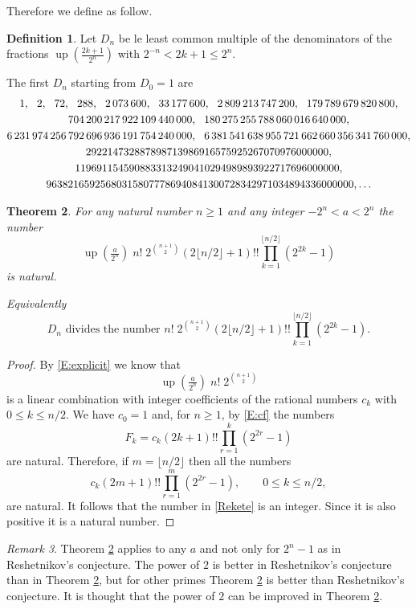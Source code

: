 \documentclass[10pt]{amsart}
\newtheorem{thm}{Theorem}
\theoremstyle{definition}
\newtheorem{defn}[thm]{Definition}
\theoremstyle{remark}
\newtheorem{rem}[thm]{Remark}
\DeclareMathOperator\up{up}
\def\nn{\mskip12mu}
\begin{document}
Therefore we define as follow.
\begin{defn} Let $D_n$ be le least common multiple of the denominators of the 
fractions $\up(\frac{2k+1}{2^n})$ with $2^{-n}<2k+1\le2^n$. 
\end{defn}

The first $D_n$ starting from $D_0=1$ are 
\begin{gather*}
1,\nn 2,\nn 72,\nn 288,\nn 2\,073\,600,\nn 33\,177\,600,\nn 2\,809\,213\,747\,200,\nn 179\,789\,679\,820\,800,\\
704\,200\,217\,922\,109\,440\,000,\nn 180\,275\,255\,788\,060\,016\,640\,000,\\
6\,231\,974\,256\,792\,696\,936\,191\,754\,240\,000,\nn 6\,381\,541\,638\,955\,721\,662\,660\,356\,341\,760\,000,\\
292214732887898713986916575925267070976000000,\\
1196911545908833132490410294989893922717696000000,\\
963821659256803158077786940841300728342971034894336000000,\dots
\end{gather*}




\begin{thm}\label{T:9}
For any natural number $n\ge1$ and any integer $-2^n< a< 2^n$ the number
\begin{equation}\label{Rekete}
\up(\tfrac{a}{2^n})\;n!\;2^{\binom{n+1}{2}}(2\lfloor n/2\rfloor+1)!! \prod_{k=1}^{\lfloor n/2\rfloor}(2^{2k}-1)
\end{equation}
is natural. 

Equivalently 
\[D_n\text{ divides the number } n!\;2^{\binom{n+1}{2}}(2\lfloor n/2\rfloor+1)!! \prod_{k=1}^{\lfloor n/2\rfloor}(2^{2k}-1).\]


\end{thm}

\begin{proof}
By \eqref{E:explicit} we know that 
\[\up(\tfrac{a}{2^n})\;n!\;2^{\binom{n+1}{2}}\]
is a linear combination with integer coefficients of the rational numbers $c_k$ with 
$0\le k\le n/2$. We have $c_0=1$ and, for $n\ge1$, by \eqref{E:cf} the numbers 
\[F_k = c_k(2k+1)!! \prod_{r=1}^{k}(2^{2r}-1)\]
are natural. Therefore, if $m=\lfloor n/2\rfloor$ then all the numbers
\[c_k (2m+1)!! \prod_{r=1}^{m}(2^{2r}-1), \qquad 0\le k\le n/2,\]
are natural.  It follows that the number in \eqref{Rekete} is an integer. Since 
it is also positive it is a natural number.
\end{proof}
\begin{rem}
Theorem \ref{T:9} applies to any $a$ and not only for $2^n-1$ as in Reshetnikov's conjecture.
The power of $2$ is better in Reshetnikov's conjecture than in Theorem \ref{T:9}, but 
for other primes  Theorem \ref{T:9} is better than Reshetnikov's conjecture.  It is thought that 
the power of $2$ can be improved in Theorem \ref{T:9}. 
\end{rem}
\end{document}
